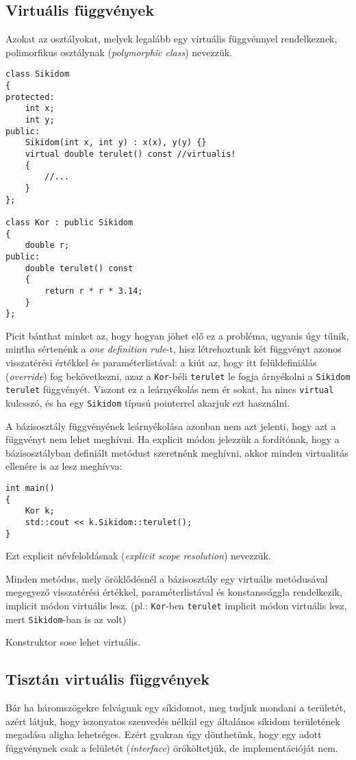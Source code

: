 \documentclass[a4paper,11.5pt,table]{article}
\begin{document}
	\subsection{Virtuális függvények}
	Azokat az osztályokat, melyek legalább egy virtuális függvénnyel rendelkeznek, polimorfikus osztálynak (\textit{polymorphic class}) nevezzük.
\begin{lstlisting}
class Sikidom
{
protected:
	int x;
	int y;
public:
	Sikidom(int x, int y) : x(x), y(y) {}
	virtual double terulet() const //virtualis!
	{
		//...
	}
};

class Kor : public Sikidom
{
	double r;
public:
	double terulet() const
	{
		return r * r * 3.14;
	}
};
\end{lstlisting}
	Picit bánthat minket az, hogy hogyan jöhet elő ez a probléma, ugyanis úgy tűnik, mintha sértenénk a \textit{one definition rule}-t, hisz létrehoztunk két függvényt azonos visszatérési értékkel és paraméterlistával: a kiút az, hogy itt felüldefiniálás (\textit{override}) fog bekövetkezni, azaz a \texttt{Kor}-béli \texttt{terulet} le fogja árnyékolni a \texttt{Sikidom} \texttt{terulet} függvényét. Viszont ez a leárnyékolás nem ér sokat, ha nincs \texttt{virtual} kulcsszó, és ha egy \texttt{Sikidom} típusú pointerrel akarjuk ezt használni.
	
	A bázisosztály függvényének leárnyékolása azonban nem azt jelenti, hogy azt a függvényt nem lehet meghívni. Ha explicit módon jelezzük a fordítónak, hogy a bázisosztályban definiált metódust szeretnénk meghívni, akkor minden virtualitás ellenére is az lesz meghívva:
	\begin{lstlisting}
int main()
{
	Kor k;
	std::cout << k.Sikidom::terulet();
}
	\end{lstlisting}
	Ezt explicit névfeloldásnak (\textit{explicit scope resolution}) nevezzük.
	\begin{note}
		Minden metódus, mely öröklődésnél a bázisosztály egy virtuális metódusával megegyező visszatérési értékkel, paraméterlistával és konstanssággla rendelkezik, implicit módon virtuális lesz. (pl.: \texttt{Kor}-ben \texttt{terulet} implicit módon virtuális lesz, mert \texttt{Sikidom}-ban is az volt)
	\end{note}
	Konstruktor sose lehet virtuális.
	\subsection{Tisztán virtuális függvények}
	Bár ha háromszögekre felvágunk egy síkidomot, meg tudjuk mondani a területét, azért látjuk, hogy iszonyatos szenvedés nélkül egy általános síkidom területének megadása aligha lehetséges. Ezért gyakran úgy dönthetünk, hogy egy adott függvénynek csak a felületét (\textit{interface}) örököltetjük, de implementációját nem.
	
\end{document}
